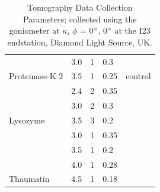 \begin{table}[h]
{\begin{tabular}{@{}lllll@{}}
                                 & 3.0    & 1             & 0.3                           &                                \\
\multirow{-2}{*}{Proteinase-K 2} & 3.5    & 1             & 0.25                          & \multirow{-2}{*}{control}      \\
                                 & 2.4    & 2             & 0.35                          &                                \\
                                 & 3.0    & 2             & 0.3                           &                                \\
\multirow{-3}{*}{Lysozyme}       & 3.5    & 3             & 0.2                           &                                \\
                                 & 3.0    & 1             & 0.35                          &                                \\
                                 & 3.5    & 1             & 0.2                           &                                \\
                                 & 4.0    & 1             & 0.28                          &                                \\
\multirow{-4}{*}{Thaumatin}      & 4.5    & 1             & 0.18                          &       \\
\bottomrule
\end{tabular}%
}

\caption{Tomography Data Collection Parameters; collected using the goniometer at $\kappa$, $\phi$ = 0$\degree$, 0$\degree$ at the I23 endstation, Diamond Light Source, UK.}
\label{tomo_table}
\end{table}







